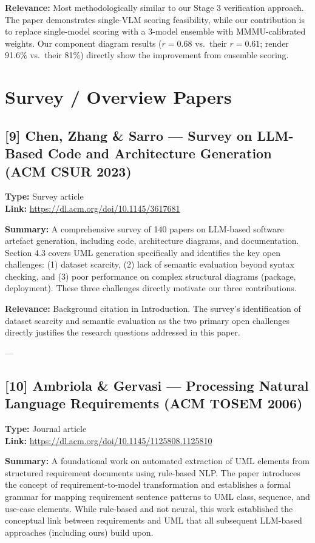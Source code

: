 \documentclass[11pt]{article}
\begin{document}
\textbf{Relevance:} Most methodologically similar to our Stage 3 verification approach. The paper demonstrates single-VLM scoring feasibility, while our contribution is to replace single-model scoring with a 3-model ensemble with MMMU-calibrated weights. Our component diagram results ($r=0.68$ vs.\ their $r=0.61$; render 91.6\% vs.\ their 81\%) directly show the improvement from ensemble scoring.

\section{Survey / Overview Papers}

\subsection*{[9] Chen, Zhang \& Sarro — Survey on LLM-Based Code and Architecture Generation (ACM CSUR 2023)}
\textbf{Type:} Survey article \\
\textbf{Link:} \url{https://dl.acm.org/doi/10.1145/3617681}

\textbf{Summary:} A comprehensive survey of 140 papers on LLM-based software artefact generation, including code, architecture diagrams, and documentation. Section 4.3 covers UML generation specifically and identifies the key open challenges: (1) dataset scarcity, (2) lack of semantic evaluation beyond syntax checking, and (3) poor performance on complex structural diagrams (package, deployment). These three challenges directly motivate our three contributions.

\textbf{Relevance:} Background citation in Introduction. The survey's identification of dataset scarcity and semantic evaluation as the two primary open challenges directly justifies the research questions addressed in this paper.

---

\subsection*{[10] Ambriola \& Gervasi — Processing Natural Language Requirements (ACM TOSEM 2006)}
\textbf{Type:} Journal article \\
\textbf{Link:} \url{https://dl.acm.org/doi/10.1145/1125808.1125810}

\textbf{Summary:} A foundational work on automated extraction of UML elements from structured requirement documents using rule-based NLP. The paper introduces the concept of requirement-to-model transformation and establishes a formal grammar for mapping requirement sentence patterns to UML class, sequence, and use-case elements. While rule-based and not neural, this work established the conceptual link between requirements and UML that all subsequent LLM-based approaches (including ours) build upon.
\end{document}
